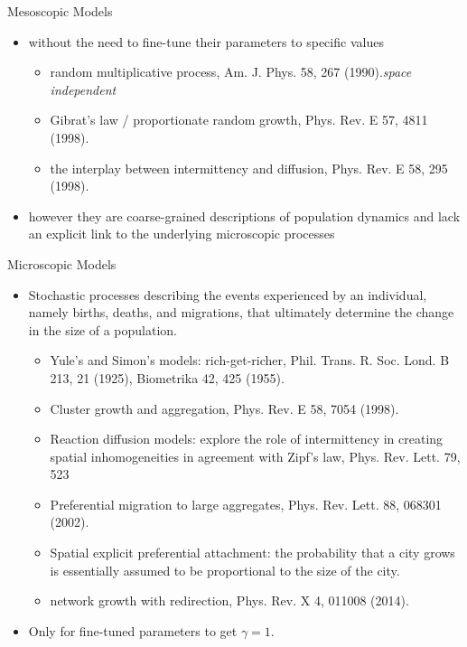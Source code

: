 \documentclass{beamer}
\begin{document}
\begin{frame}{Mesoscopic Models}
\begin{itemize}
  \item without the need to fine-tune their parameters to specific values
  \begin{itemize}
    \item random multiplicative process, Am. J. Phys. 58, 267 (1990).\emph{space independent}
    \item Gibrat's law / proportionate random growth, Phys. Rev. E 57, 4811 (1998).
    \item the interplay between intermittency and diffusion, Phys. Rev. E 58, 295 (1998).
  \end{itemize}
  \item however they are coarse-grained descriptions of population dynamics and lack an explicit link to the underlying microscopic processes
\end{itemize}  
\end{frame}

\begin{frame}{Microscopic Models}
  \begin{itemize}
    \item Stochastic processes describing the events experienced by an individual, namely births, deaths, and migrations, that ultimately determine the change in the size of a population.
    \begin{itemize}
      \item Yule's and Simon's models: rich-get-richer, Phil. Trans. R. Soc. Lond. B 213, 21 (1925), Biometrika 42, 425 (1955).
      \item Cluster growth and aggregation, Phys. Rev. E 58, 7054 (1998). 
      \item Reaction diffusion models: explore the role of intermittency in creating spatial inhomogeneities in agreement with Zipf’s law, Phys. Rev. Lett. 79, 523
      \item Preferential migration to large aggregates, Phys. Rev. Lett. 88, 068301 (2002).
      \item Spatial explicit preferential attachment: the probability that a city grows is essentially assumed to be proportional to the size of the city.
      \item network growth with redirection, Phys. Rev. X 4, 011008 (2014).
    \end{itemize}
    \item Only for fine-tuned parameters to get $\gamma=1$.
  \end{itemize}
\end{frame}
\end{document}
